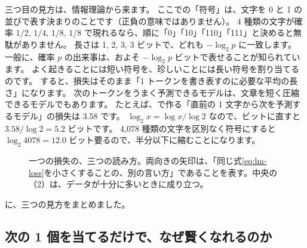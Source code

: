 三つ目の見方は、情報理論から来ます\cite{shannon1948mathematical}。
ここでの「符号」は、文字を 0 と 1 の並びで表す決まりのことです（正負の意味ではありません）。
4 種類の文字が確率 $1/2,\,1/4,\,1/8,\,1/8$ で現れるなら、順に「0」「10」「110」「111」と決めると無駄がありません。
長さは 1, 2, 3, 3 ビットで、どれも $-\log_2 p$ に一致します。
一般に、確率 $p$ の出来事は、およそ $-\log_2 p$ ビットで表せることが知られています。
よく起きることには短い符号を、珍しいことには長い符号を割り当てるのです。
すると、損失はそのまま「1 トークンを書き表すのに必要な平均の長さ」になります。
次のトークンをうまく予測できるモデルは、文章を短く圧縮できるモデルでもあります。
たとえば、で作る「直前の 1 文字から次を予測するモデル」の損失は 3.58 です。
$\log_2 x=\log x/\log 2$ なので、ビットに直すと $3.58/\log 2=5.2$ ビットです。
4,078 種類の文字を区別なく符号にすると $\log_2 4078=12.0$ ビット要るので、半分以下に縮むことになります。

\begin{figure}[htbp]
\centering
{}
\caption{一つの損失の、三つの読み方。両向きの矢印は、「同じ式\eqref{eq:lm-loss}を小さくすることの、別の言い方」であることを表す。中央の（2）は、データが十分に多いときに成り立つ。}
\label{fig:lm-why}
\end{figure}

に、三つの見方をまとめました。

\subsection*{次の 1 個を当てるだけで、なぜ賢くなれるのか}

